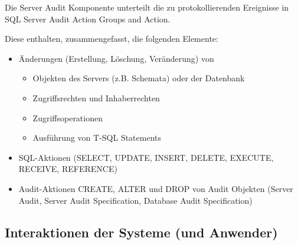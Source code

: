 Die Server Audit Komponente unterteilt die zu protokollierenden Ereignisse in \glqq SQL Server Audit Action Groups and Action\grqq . 

Diese enthalten, zusammengefasst, die folgenden Elemente:
\begin{itemize}
\item Änderungen (Erstellung, Löschung, Veränderung) von
\begin{itemize}
\item Objekten des Servers (z.B. Schemata) oder der Datenbank
\item Zugriffsrechten und Inhaberrechten
\item Zugriffsoperationen
\item Ausführung von T-SQL Statements
\end{itemize}
\item SQL-Aktionen (SELECT, UPDATE, INSERT, DELETE, EXECUTE, RECEIVE, REFERENCE)
\item Audit-Aktionen CREATE, ALTER und DROP von Audit Objekten (Server Audit, Server Audit Specification, Database Audit Specification)
\end{itemize}
\citep{MSSQL6}




\subsection{Interaktionen der Systeme (und Anwender)}


